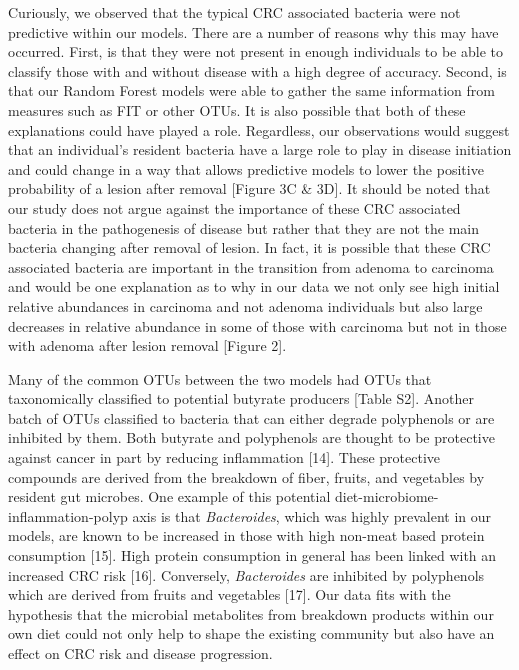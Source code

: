 \documentclass[12pt,]{article}
\begin{document}
Curiously, we observed that the typical CRC associated bacteria were not
predictive within our models. There are a number of reasons why this may
have occurred. First, is that they were not present in enough
individuals to be able to classify those with and without disease with a
high degree of accuracy. Second, is that our Random Forest models were
able to gather the same information from measures such as FIT or other
OTUs. It is also possible that both of these explanations could have
played a role. Regardless, our observations would suggest that an
individual's resident bacteria have a large role to play in disease
initiation and could change in a way that allows predictive models to
lower the positive probability of a lesion after removal {[}Figure 3C \&
3D{]}. It should be noted that our study does not argue against the
importance of these CRC associated bacteria in the pathogenesis of
disease but rather that they are not the main bacteria changing after
removal of lesion. In fact, it is possible that these CRC associated
bacteria are important in the transition from adenoma to carcinoma and
would be one explanation as to why in our data we not only see high
initial relative abundances in carcinoma and not adenoma individuals but
also large decreases in relative abundance in some of those with
carcinoma but not in those with adenoma after lesion removal {[}Figure
2{]}.

Many of the common OTUs between the two models had OTUs that
taxonomically classified to potential butyrate producers {[}Table S2{]}.
Another batch of OTUs classified to bacteria that can either degrade
polyphenols or are inhibited by them. Both butyrate and polyphenols are
thought to be protective against cancer in part by reducing inflammation
{[}14{]}. These protective compounds are derived from the breakdown of
fiber, fruits, and vegetables by resident gut microbes. One example of
this potential diet-microbiome-inflammation-polyp axis is that
\emph{Bacteroides}, which was highly prevalent in our models, are known
to be increased in those with high non-meat based protein consumption
{[}15{]}. High protein consumption in general has been linked with an
increased CRC risk {[}16{]}. Conversely, \emph{Bacteroides} are
inhibited by polyphenols which are derived from fruits and vegetables
{[}17{]}. Our data fits with the hypothesis that the microbial
metabolites from breakdown products within our own diet could not only
help to shape the existing community but also have an effect on CRC risk
and disease progression.
\end{document}
